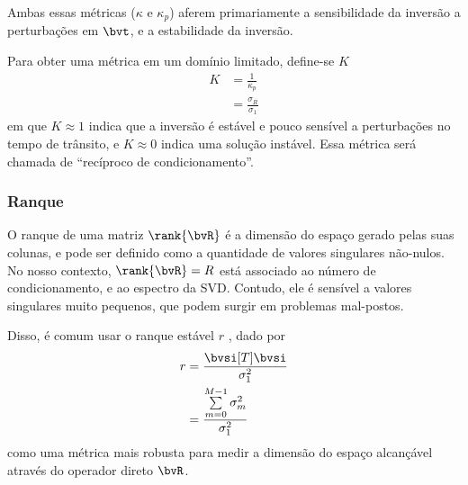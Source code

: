 Ambas essas métricas ($\kappa$ e $\kappa_p$) aferem primariamente a sensibilidade da inversão a perturbações em $\bvt$, e a estabilidade da inversão.

Para obter uma métrica em um domínio limitado, define-se $K$
\begin{equation}
	\begin{split}
		K
		& = \frac{1}{\kappa_p} \\
		& = \frac{\sigma_R}{\sigma_1}
	\end{split}
\end{equation}
em que $K \approx 1$ indica que a inversão é estável e pouco sensível a perturbações no tempo de trânsito, e $K \approx 0$ indica uma solução instável. Essa métrica será chamada de ``recíproco de condicionamento''.

%

\subsubsection*{Ranque}

O ranque de uma matriz $\rank{\bvR}$ é a dimensão do espaço gerado pelas suas colunas, e pode ser definido como a quantidade de valores singulares não-nulos. No nosso contexto, $\rank{\bvR} = R$ está associado ao número de condicionamento, e ao espectro da SVD. Contudo, ele é sensível a valores singulares muito pequenos, que podem surgir em problemas mal-postos.

Disso, é comum usar o ranque estável $r$ \cite{ipsen_stable_2025}, dado por
\begin{equation}
	\begin{split}
		r
		& = \frac{\bvsi[T]\bvsi}{\sigma_1^2} \\
		& = \frac{\sum\limits_{m=0}^{M-1} \sigma_m^2}{\sigma_1^2}
	\end{split}
\end{equation}
como uma métrica mais robusta para medir a dimensão do espaço alcançável através do operador direto $\bvR$.

